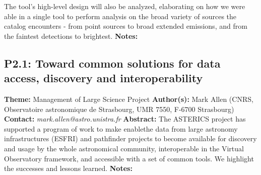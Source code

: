 \documentclass{report}
\begin{document}
{{{{{{The tool’s high-level design will also be analyzed, elaborating on how we were able in a single tool to perform analysis on the broad variety of sources the catalog encounters - from point sources to broad extended emissions, and from the faintest detections to brightest.\newline
{\bf Notes:}\newline
{\newpage
\subsection*{P2.1: Toward common solutions for data access, discovery and interoperability}
{\bf Theme:}  Management of Large Science Project\newline
{\bf Author(s):}\newline
Mark Allen (CNRS, Observatoire astronomique de Strasbourg, UMR 7550, F-6700 Strasbourg) \newline   \newline   \newline   \newline  \newline  \newline\newline
{\bf Contact:} {\it mark.allen@astro.unistra.fr}\newline
\newline\newline
{\bf Abstract:}\newline
The ASTERICS project has supported a program of work to make enablethe data from large astronomy infrastructures (ESFRI) and pathfinder projects to become available for discovery and usage by the whole astronomical community, interoperable in the Virtual Observatory framework, and accessible with a set of common tools.  We highlight the successes and lessons learned.\newline
{\bf Notes:}\newline
{\newpage
}}}}}}}}
\end{document}
